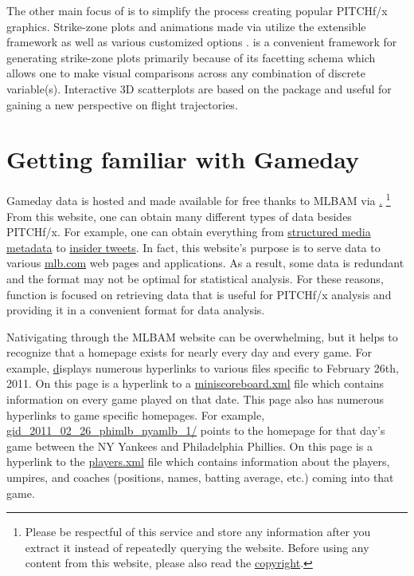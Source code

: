 \begin{article}
The other main focus of  is to simplify the process
creating popular PITCHf/x graphics. Strike-zone plots and animations
made via  utilize the extensible  framework
as well as various customized options \citep{ggplot2}. 
is a convenient framework for generating strike-zone plots primarily
because of its facetting schema which allows one to make visual comparisons
across any combination of discrete variable(s). Interactive 3D scatterplots
are based on the  package and useful for gaining a new perspective
on flight trajectories.

\section{Getting familiar with Gameday}

Gameday data is hosted and made available for free thanks to MLBAM via
\href{http://gd2.mlb.com/components/game/mlb/}.%
\footnote{Please be respectful of this service and store any
  information after you extract it instead of repeatedly querying the
  website. Before using any content from this website, please also
  read the
  \href{http://gdx.mlb.com/components/copyright.txt}{copyright}. %
} From this website, one can obtain many different types of data
besides PITCHf/x. For example, one can obtain everything from
\href{http://gd2.mlb.com/components/game/mlb/year_2013/month_07/day_16/gid_2013_07_16_aasmlb_nasmlb_1/media/instadium.xml}{structured
  media metadata} to
\href{http://gd2.mlb.com/components/game/mlb/twitter/anaInsiderTweets.xml}{insider
  tweets}.  In fact, this website's purpose is to serve data to
various \href{http://mlb.com}{mlb.com} web pages and applications. As a
result, some data is redundant and the format may not be optimal for
statistical analysis. For these reasons, function  is
focused on retrieving data that is useful for PITCHf/x analysis and
providing it in a convenient format for data analysis.

Nativigating through the MLBAM website can be overwhelming, but it
helps to recognize that a homepage exists for nearly every day and
every game. For example,
\href{http://gd2.mlb.com/components/game/mlb/year_2011/month_02/day_26/}
displays numerous hyperlinks to various files specific to February
26th, 2011. On this page is a hyperlink to a
\href{http://gd2.mlb.com/components/game/mlb/year_2011/month_02/day_26/miniscoreboard.xml}{miniscoreboard.xml}
file which contains information on every game played on that date.
This page also has numerous hyperlinks to game specific homepages.
For example,
\href{http://gd2.mlb.com/components/game/mlb/year_2011/month_02/day_26/gid_2011_02_26_phimlb_nyamlb_1/}{gid\_2011\_02\_26\_phimlb\_nyamlb\_1/}
points to the homepage for that day's game between the NY Yankees and
Philadelphia Phillies. On this page is a hyperlink to the
\href{http://gd2.mlb.com/components/game/mlb/year_2011/month_02/day_26/gid_2011_02_26_phimlb_nyamlb_1/players.xml}{players.xml}
file which contains information about the players, umpires, and
coaches (positions, names, batting average, etc.) coming into that
game.


\end{article}
